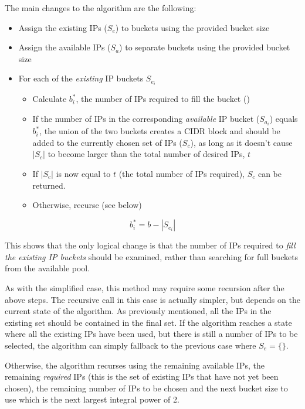 The main changes to the algorithm are the following:

\begin{itemize}
  \item{Assign the existing IPs ($S_e$) to buckets using the provided bucket size}
  \item{Assign the available IPs ($S_a$) to separate buckets using the provided bucket size}
  \item{For each of the \textit{existing} IP buckets $S_{e_i}$}
      \begin{itemize}
      \item{Calculate $b^*_i$, the number of IPs required to fill the bucket ()}
      \item{If the number of IPs in the corresponding \textit{available} IP bucket ($S_{a_i}$) equals $b^*_i$, the union of the two buckets creates a CIDR block and should be added to the currently chosen set of IPs ($S_c$), as long as it doesn't cause $|S_c|$ to become larger than the total number of desired IPs, $t$}
      \item{If $|S_c|$ is now equal to $t$ (the total number of IPs required), $S_c$ can be returned.}
      \item{Otherwise, recurse (see below)}
      \end{itemize}
\end{itemize}


\begin{equation}\label{eq:ipsToFillBucket}
b^*_i= b-|S_{e_i}|
\end{equation}


This shows that the only logical change is that the number of IPs required to \textit{fill the existing IP buckets} should be examined, rather than searching for full buckets from the available pool. 

As with the simplified case, this method may require some recursion after the above steps. The recursive call in this case is actually simpler, but depends on the current state of the algorithm. As previously mentioned, all the IPs in the existing set should be contained in the final set. If the algorithm reaches a state where all the existing IPs have been used, but there is still a number of IPs to be selected, the algorithm can simply fallback to the previous case where $S_e = \{\}$. 

Otherwise, the algorithm recurses using the remaining available IPs, the remaining \textit{required} IPs (this is the set of existing IPs that have not yet been chosen), the remaining number of IPs to be chosen and the next bucket size to use which is the next largest integral power of 2.

